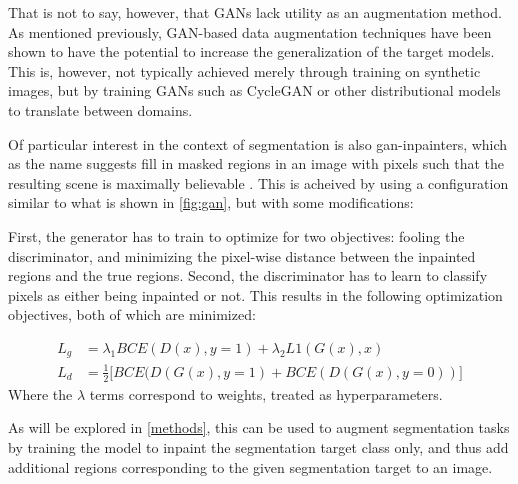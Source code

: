      That is not to say, however, that GANs lack utility as an augmentation method. As mentioned previously, GAN-based data augmentation techniques have been shown to have the potential to increase the generalization of the target models. This is, however, not typically achieved merely through training on synthetic images, but by training GANs such as CycleGAN \cite{cyclegan} or other distributional models \cite{covid} to translate between domains. 
     
     Of particular interest in the context of segmentation is also \gls{gan}-inpainters, which as the name suggests fill in masked regions in an image with pixels such that the resulting scene is maximally believable \cite{inpainter_basic}. This is acheived by using a configuration similar to what is shown in \autoref{fig:gan}, but with some modifications:
     
     First, the generator has to train to optimize for two objectives: fooling the discriminator, and minimizing the pixel-wise distance between the inpainted regions and the true regions. Second, the discriminator has to learn to classify pixels as either being inpainted or not. This results in the following optimization objectives, both of which are minimized:
     
     \begin{align}
    L_g &= \lambda_1 BCE(D(x),y=1) + \lambda_2 L1(G(x), x) \\
    L_d &= \frac{1}{2}\big[ BCE(D(G(x),y=1)+BCE(D(G(x), y=0)) \big]
    \end{align}
    Where the \(\lambda\) terms correspond to weights, treated as hyperparameters. 
     
    As will be explored in \autoref{methods}, this can be used to augment segmentation tasks by training the model to inpaint the segmentation target class only, and thus add additional regions corresponding to the given segmentation target to an image.

